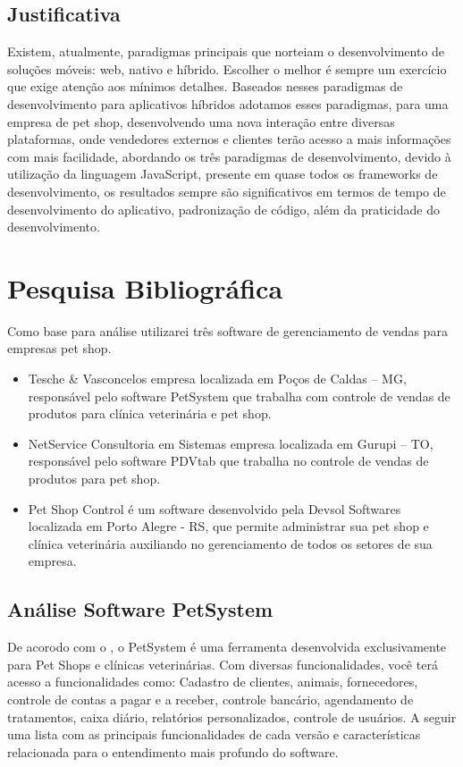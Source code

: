 \documentclass[12pt,openright,twoside,a4paper,english,french,spanish,brazil]{abntex2}
\begin{document}
\section*{Justificativa}
Existem, atualmente, paradigmas principais que norteiam o desenvolvimento de soluções móveis: web, nativo e híbrido. Escolher o melhor é sempre um exercício que exige atenção aos mínimos detalhes.
Baseados nesses paradigmas de desenvolvimento para aplicativos híbridos adotamos esses paradigmas, para uma empresa de pet shop, desenvolvendo uma nova interação entre diversas plataformas, onde vendedores externos e clientes terão acesso a mais informações com mais facilidade, abordando os três paradigmas de desenvolvimento, devido à utilização da linguagem JavaScript, presente em quase todos os frameworks de desenvolvimento, os resultados sempre são significativos em termos de tempo de desenvolvimento do aplicativo, padronização de código, além da praticidade do desenvolvimento.

\chapter*[Pesquisa Bibliográfica]{Pesquisa Bibliográfica}

Como base para análise utilizarei três software de gerenciamento de vendas para empresas pet shop.

\begin{itemize}
\item Tesche \& Vasconcelos empresa localizada em Poços de Caldas – MG, responsável pelo software PetSystem que trabalha com controle de vendas de produtos para clínica veterinária e pet shop.
\item NetService Consultoria em Sistemas empresa localizada em Gurupi – TO, responsável pelo software PDVtab que trabalha no controle de vendas de produtos para pet shop.
\item Pet Shop Control é um software desenvolvido pela Devsol Softwares localizada em Porto Alegre - RS, que permite administrar sua pet shop e clínica veterinária auxiliando no gerenciamento de todos os setores de sua empresa.
\end{itemize}

\section*{Análise Software PetSystem}
De acorodo com o \cite{TESCHE&VASCONCELOS2013}, o PetSystem é uma ferramenta desenvolvida exclusivamente para Pet Shops e clínicas veterinárias. Com diversas funcionalidades, você terá acesso a funcionalidades como: Cadastro de clientes, animais, fornecedores, controle de contas a pagar e a receber, controle bancário, agendamento de tratamentos, caixa diário, relatórios personalizados, controle de usuários. A seguir uma lista com as principais funcionalidades de cada versão e características relacionada para o entendimento mais profundo do software.
\end{document}
